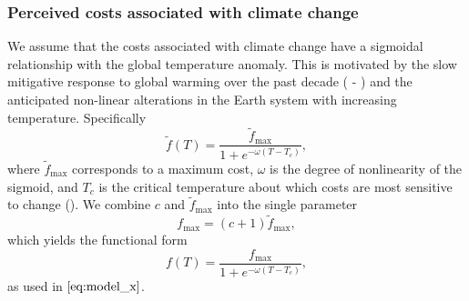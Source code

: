 \documentclass[10pt,letterpaper]{article}
\begin{document}
\subsubsection*{Perceived costs associated with climate change} 
We assume that the costs associated with climate change have a sigmoidal relationship with the global temperature anomaly. This is motivated by the slow mitigative response to global warming over the past decade ( - ) and the anticipated non-linear alterations in the Earth system with increasing temperature\cite{lenton08}. Specifically
\begin{equation}
\tilde{f}(T) =\frac{\tilde{f}_{\text{max}}}{1+e^{-\omega(T-T_c)}},
\end{equation}
where $\tilde{f}_{\text{max}}$ corresponds to a maximum cost, $\omega$ is the degree of nonlinearity of the sigmoid, and $T_c$ is the critical temperature about which costs are most sensitive to change (). We combine $c$ and $\tilde{f}_{\text{max}}$ into the single parameter
\begin{equation}
    f_{\text{max}} =   (c+1)\tilde{f}_{\text{max}},
\end{equation}
which yields the functional form
\begin{equation}
    f(T) = \frac{{f}_{\text{max}}}{1+e^{-\omega(T-T_c)}},
\end{equation}
as used in $\eqref{eq:model_x}$.

\end{document}
